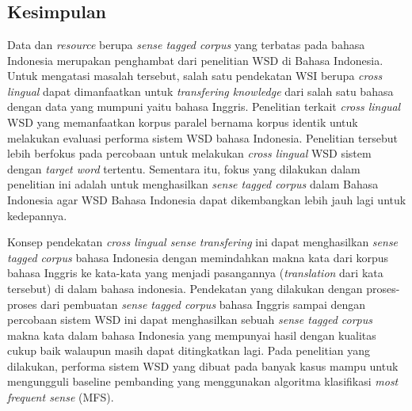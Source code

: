 \chapter{\babEnam}

\section{Kesimpulan}

Data dan \textit{resource} berupa \textit{sense tagged corpus} yang terbatas pada bahasa Indonesia merupakan penghambat dari penelitian WSD di Bahasa Indonesia. Untuk mengatasi masalah tersebut, salah satu pendekatan WSI berupa \textit{cross lingual} dapat dimanfaatkan untuk \textit{transfering knowledge} dari salah satu bahasa dengan data yang mumpuni yaitu bahasa Inggris. Penelitian \citep{septiantri2013wsd} terkait \textit{cross lingual} WSD yang memanfaatkan korpus paralel bernama korpus identik untuk melakukan evaluasi performa sistem WSD bahasa Indonesia. Penelitian tersebut lebih berfokus pada percobaan untuk melakukan \textit{cross lingual} WSD sistem dengan \textit{target word} tertentu. Sementara itu, fokus yang dilakukan dalam penelitian ini adalah untuk menghasilkan \textit{sense tagged corpus} dalam Bahasa Indonesia agar WSD Bahasa Indonesia dapat dikembangkan lebih jauh lagi untuk kedepannya. 

Konsep pendekatan \textit{cross lingual sense transfering} ini dapat menghasilkan \textit{sense tagged corpus} bahasa Indonesia dengan memindahkan makna kata dari korpus bahasa Inggris ke kata-kata yang menjadi pasangannya (\textit{translation} dari kata tersebut) di dalam bahasa indonesia. Pendekatan yang dilakukan dengan proses-proses dari pembuatan \textit{sense tagged corpus} bahasa Inggris sampai dengan percobaan sistem WSD ini dapat menghasilkan sebuah \textit{sense tagged corpus} makna kata dalam bahasa Indonesia yang mempunyai hasil dengan kualitas cukup baik walaupun masih dapat ditingkatkan lagi. Pada penelitian yang dilakukan, performa sistem WSD yang dibuat pada banyak kasus mampu untuk mengungguli baseline pembanding yang menggunakan algoritma klasifikasi \textit{most frequent sense} (MFS).
